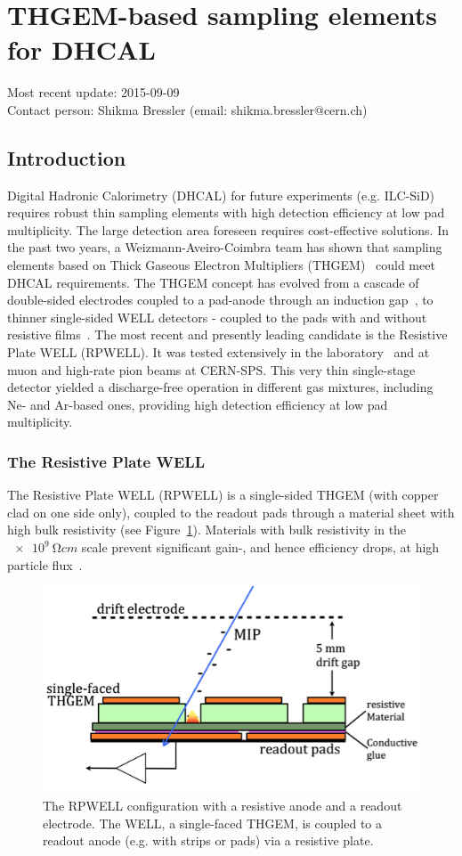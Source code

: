 \section{THGEM-based sampling elements for DHCAL}
Most recent update: 2015-09-09 \\
Contact person: Shikma Bressler (email: shikma.bressler@cern.ch)
\subsection{Introduction}
Digital Hadronic Calorimetry (DHCAL) for future experiments (e.g. ILC-SiD) requires robust thin sampling elements with high detection efficiency at low pad multiplicity. The large detection area foreseen requires cost-effective solutions.
In the past two years, a Weizmann-Aveiro-Coimbra team has shown that sampling elements based on Thick Gaseous Electron Multipliers (THGEM)~\cite{Chechik2004303} could meet DHCAL requirements. The THGEM concept has evolved from a cascade of double-sided electrodes coupled to a pad-anode through an induction gap~\cite{1748-0221-7-05-C05011}, to thinner single-sided WELL detectors - coupled to the pads with and without resistive films~\cite{1748-0221-9-04-P04011,1748-0221-8-07-P07017}.
The most recent and presently leading candidate is the Resistive Plate WELL (RPWELL). It was tested extensively in the laboratory~\cite{1748-0221-8-11-P11004,1748-0221-8-12-C12012} and at muon and high-rate pion beams at CERN-SPS. This very thin single-stage detector yielded a discharge-free operation in different gas mixtures, including Ne- and Ar-based ones, providing high detection efficiency at low pad multiplicity.

\subsubsection{The Resistive Plate WELL}
The Resistive Plate WELL (RPWELL) is a single-sided THGEM (with copper clad on one side only), coupled to the readout pads through a material sheet with high bulk resistivity (see Figure~\ref{fig:Calorimeter:THGEM:rpwell}). Materials with bulk resistivity in the $\SI{e9}{\ohm cm}$ scale prevent significant gain-, and hence efficiency drops, at high particle flux~\cite{1748-0221-8-11-P11004}.
\begin{figure}
	\centering
	\includegraphics[width=.5\textwidth]{Calorimeter/THGEM/rpwell.png}
	\caption{The RPWELL configuration with a resistive anode and a readout electrode. The WELL, a single-faced THGEM, is coupled to a readout anode (e.g. with strips or pads) via a resistive plate.}
	\label{fig:Calorimeter:THGEM:rpwell}
\end{figure}
